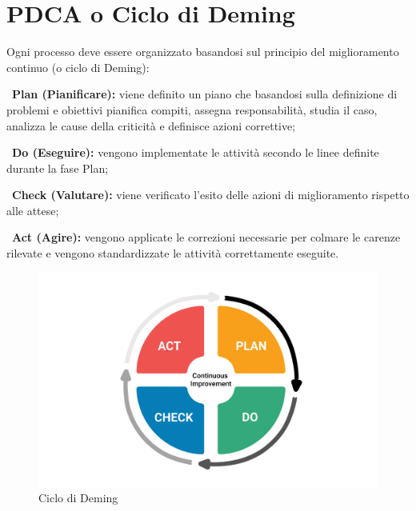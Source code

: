 \section{PDCA o Ciclo di Deming}
Ogni processo deve essere organizzato basandosi sul principio del miglioramento
continuo (o ciclo di Deming\pedice):

~\newline\textbf{Plan (Pianificare):} viene definito un piano che basandosi sulla definizione di
problemi e obiettivi pianifica compiti, assegna responsabilità, studia il caso,
analizza le cause della criticità e definisce azioni correttive;

~\newline\textbf{Do (Eseguire):} vengono implementate le attività secondo le linee definite durante
la fase Plan;

~\newline\textbf{Check (Valutare):} viene verificato l’esito delle azioni di miglioramento rispetto
alle attese;

~\newline\textbf{Act (Agire):} vengono applicate le correzioni necessarie per colmare le carenze
rilevate e vengono standardizzate le attività correttamente eseguite.

\begin{figure}[!htbp]
	\centering
	\includegraphics[scale=0.3]{pdca.png}
	\caption{Ciclo di Deming}
\end{figure}